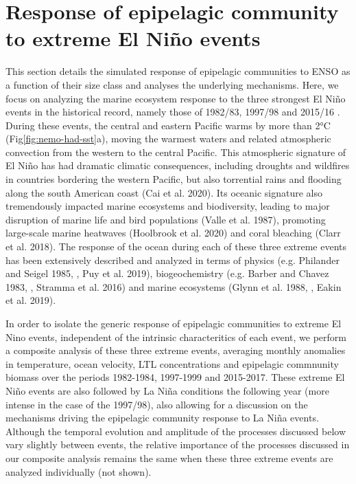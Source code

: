 \section{Response of epipelagic community to extreme El Niño events}

This section details the simulated response of epipelagic communities to ENSO as a function of their size class and analyses the underlying mechanisms. Here, we focus on  analyzing the marine ecosystem response to the three strongest El Niño events in the historical record, namely those of 1982/83, 1997/98 and 2015/16 \citep{santosoDefiningCharacteristicsENSO2017}. During these events, the central and eastern Pacific warms by more than 2°C (Fig\ref{fig:nemo-had-sst}a), moving the warmest waters and related atmospheric convection from the western to the central Pacific. This atmospheric signature of El Niño has had dramatic climatic consequences, including droughts and wildfires in countries bordering the western Pacific, but also torrential rains and flooding along the south American coast (Cai et al. 2020). Its oceanic signature also tremendously impacted marine ecosystems and biodiversity, leading to major disruption of marine life and bird populations (Valle et al. 1987), promoting large-scale marine heatwaves (Hoolbrook et al. 2020) and coral bleaching (Clarr et al. 2018).  The response of the ocean during each of these three extreme events has been extensively described and analyzed in terms of physics  (e.g. Philander and Seigel 1985, \citealt{lengaigneOceanResponseMarch2002}, Puy et al. 2019), biogeochemistry (e.g. Barber and Chavez 1983, \citep{chavezBiologicalChemicalResponse1999}, Stramma et al. 2016) and marine ecosystems (Glynn et al. 1988, \citep{glynnCoralBleachingMortality2001}, Eakin et al. 2019). 

In order to isolate the generic response of epipelagic communities to extreme El Nino events, independent of the intrinsic characteritics of each event, we perform a composite analysis of these three extreme events, averaging monthly anomalies in temperature, ocean velocity, LTL concentrations and epipelagic commnunity biomass over the periods 1982-1984, 1997-1999 and 2015-2017. These extreme El Niño events are also followed by La Niña conditions the following year (more intense in the case of the 1997/98), also allowing for a discussion on the mechanisms driving the epipelagic community response to La Niña events. Although the temporal evolution and amplitude of the processes discussed below vary slightly between events, the relative importance of the processes discussed in our composite analysis remains the same when these three extreme events are analyzed individually (not shown). 

